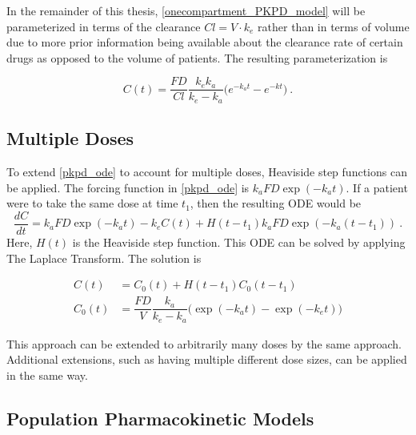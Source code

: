 In the remainder of this thesis, \cref{onecompartment_PKPD_model} will be parameterized in terms of the clearance  $Cl = V \cdot k_e$ rather than in terms of volume due to more prior information being available about the clearance rate of certain drugs as opposed to the volume of patients.  The resulting parameterization is

\begin{equation}\label{onecompartment_PKPD_cl}
	C(t) = \dfrac{F D}{Cl}\dfrac{k_ek_a}{k_e - k_a}\Big(e^{-k_at} - e^{-kt}\Big) \>.
\end{equation}


\subsection{Multiple Doses}

To extend \cref{pkpd_ode} to account for multiple doses, Heaviside step functions can be applied.  The forcing function in \cref{pkpd_ode} is $ k_aFD\exp(-k_a t)$.  If a patient were to take the same dose at time $t_1$, then the resulting ODE would be
\begin{equation}  \label{pkpd_ode_2_doses}
	\dfrac{dC}{dt} = k_aFD\exp(-k_a t) - k_eC(t) + H(t-t_1)k_aFD\exp(-k_a (t-t_1)) \>.
\end{equation}
\noindent Here, $H(t)$ is the Heaviside step function.  This ODE can be solved by applying The Laplace Transform.  The solution is 

\begin{align*}
	C(t) &=  C_0(t) + H(t-t_1)C_0(t-t_1)\\
	C_0(t) &= \dfrac{F D}{V}\dfrac{k_a}{k_e - k_a}\Big(\exp(-k_at) - \exp(-k_et)\Big)
\end{align*}

\noindent  This approach can be extended to arbitrarily many doses by the same approach.  Additional extensions, such as having multiple different dose sizes, can be applied in the same way.


\subsection{Population Pharmacokinetic Models}


